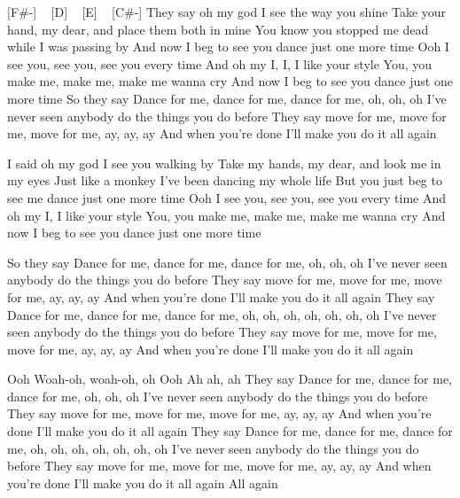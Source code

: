 [F#-] ~ [D] ~ [E] ~ [C#-]
They say oh my god I see the way you shine
Take your hand, my dear, and place them both in mine
You know you stopped me dead while I was passing by
And now I beg to see you dance just one more time
Ooh I see you, see you, see you every time
And oh my I, I, I like your style
You, you make me, make me, make me wanna cry
And now I beg to see you dance just one more time
So they say
Dance for me, dance for me, dance for me, oh, oh, oh
I've never seen anybody do the things you do before
They say move for me, move for me, move for me, ay, ay, ay
And when you're done I'll make you do it all again

I said oh my god I see you walking by
Take my hands, my dear, and look me in my eyes
Just like a monkey I've been dancing my whole life
But you just beg to see me dance just one more time
Ooh I see you, see you, see you every time
And oh my I, I like your style
You, you make me, make me, make me wanna cry
And now I beg to see you dance just one more time

So they say
Dance for me, dance for me, dance for me, oh, oh, oh
I've never seen anybody do the things you do before
They say move for me, move for me, move for me, ay, ay, ay
And when you're done I'll make you do it all again
They say
Dance for me, dance for me, dance for me, oh, oh, oh, oh, oh, oh, oh
I've never seen anybody do the things you do before
They say move for me, move for me, move for me, ay, ay, ay
And when you're done I'll make you do it all again

Ooh
Woah-oh, woah-oh, oh
Ooh
Ah ah, ah
They say
Dance for me, dance for me, dance for me, oh, oh, oh
I've never seen anybody do the things you do before
They say move for me, move for me, move for me, ay, ay, ay
And when you're done I'll make you do it all again
They say
Dance for me, dance for me, dance for me, oh, oh, oh, oh, oh, oh, oh
I've never seen anybody do the things you do before
They say move for me, move for me, move for me, ay, ay, ay
And when you're done I'll make you do it all again
All again